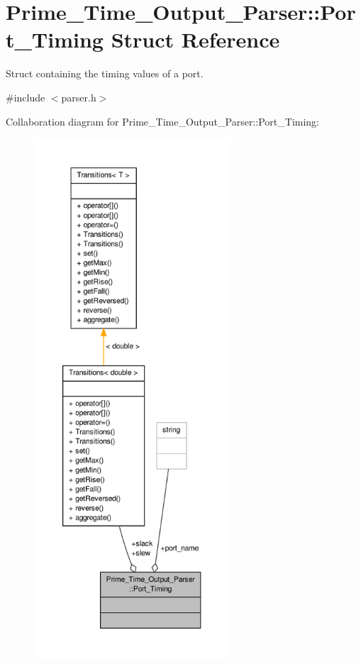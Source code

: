 \hypertarget{structPrime__Time__Output__Parser_1_1Port__Timing}{\section{Prime\-\_\-\-Time\-\_\-\-Output\-\_\-\-Parser\-:\-:Port\-\_\-\-Timing Struct Reference}
\label{structPrime__Time__Output__Parser_1_1Port__Timing}
}


Struct containing the timing values of a port.  




{\ttfamily \#include $<$parser.\-h$>$}



Collaboration diagram for Prime\-\_\-\-Time\-\_\-\-Output\-\_\-\-Parser\-:\-:Port\-\_\-\-Timing\-:\nopagebreak
\begin{figure}[H]
\begin{center}
\leavevmode
\includegraphics[height=550pt]{structPrime__Time__Output__Parser_1_1Port__Timing__coll__graph}
\end{center}
\end{figure}

